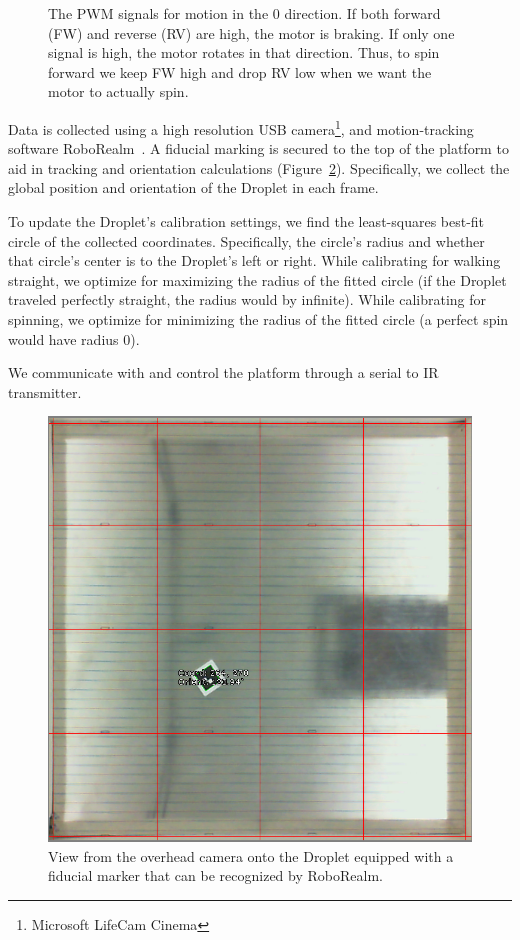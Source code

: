 \documentclass[letterpaper, 10pt, conference]{ieeeconf}
\begin{document}
\begin{figure}[!htb]
\centering

\caption{The PWM signals for motion in the 0 direction. If both forward (FW) and reverse (RV) are high, the motor is braking. If only one signal is high, the motor rotates in that direction. Thus, to spin forward we keep FW high and drop RV low when we want the motor to actually spin.}
\label{fig:pwmSignals}
\end{figure}

Data is collected using a high resolution USB camera\footnote{Microsoft LifeCam Cinema}, and motion-tracking software RoboRealm~\cite{RoboRealm}. A fiducial marking is secured to the top of the platform to aid in tracking and orientation calculations (Figure~\ref{fig:expsetup}). Specifically, we collect the global position and orientation of the Droplet in each frame.

To update the Droplet's calibration settings, we find the least-squares best-fit circle of the collected coordinates. Specifically, the circle's radius and whether that circle's center is to the Droplet's left or right. While calibrating for walking straight, we optimize for maximizing the radius of the fitted circle (if the Droplet traveled perfectly straight, the radius would by infinite). While calibrating for spinning, we optimize for minimizing the radius of the fitted circle (a perfect spin would have radius 0).

We communicate with and control the platform through a serial to IR transmitter. 

\begin{figure}[!htb]
\includegraphics[width=\linewidth]{images/cameraView}
\caption{View from the overhead camera onto the Droplet equipped with a fiducial marker that can be recognized by RoboRealm.\label{fig:expsetup}} 
\end{figure}
\end{document}
